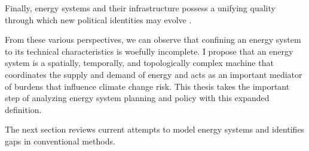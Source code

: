 Finally, energy systems and their infrastructure possess a unifying quality
through which new political identities may evolve \cite{bridge_energy_2018}.

From these various perspectives, we can observe that confining an energy system
to its technical characteristics is woefully incomplete. I propose that an
energy system is a spatially, temporally, and topologically complex machine that
coordinates the supply and demand of energy and acts as an important mediator of
burdens that influence climate change risk. This thesis takes the important step
of analyzing energy system planning and policy with this expanded definition.








The next section reviews current attempts to model energy systems and identifies
gaps in conventional methods.
